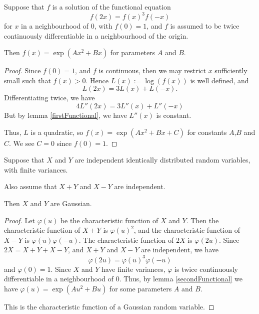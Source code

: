 \documentclass{unswmaths}
\begin{document}
\begin{lemma}
\label{secondFunctional}
    Suppose that $f$ is a solution of
    the functional equation
    \begin{equation*}
        f(2x) = f(x)^3f(-x)
    \end{equation*} 
    for $x$ in a neighbourhood of $0$, 
    with $f(0) = 1$, and $f$ is assumed to be twice
    continuously
    differentiable in a neighbourhood of
    the origin.
    
    Then $f(x) = \exp(Ax^2+Bx)$ for parameters $A$ and $B$.
\end{lemma} 
\begin{proof}
    Since $f(0) = 1$, and $f$ is continuous, then we may restrict
    $x$ sufficiently small such that $f(x) > 0$. Hence $L(x) := \log(f(x))$
    is well defined, and
    \begin{equation*}
        L(2x) = 3L(x)+L(-x).
    \end{equation*}
    Differentiating twice, we have
    \begin{equation*}
        4L''(2x) = 3L''(x)+L''(-x)
    \end{equation*}
    But by lemma \ref{firstFunctional}, we have $L''(x)$
    is constant. 
    
    Thus, $L$ is a quadratic, so $f(x) = \exp(Ax^2+Bx+C)$
    for constants $A$,$B$ and $C$. We see $C=0$
    since $f(0) = 1$.    
\end{proof}

\begin{theorem}
    Suppose that $X$ and $Y$ are independent identically distributed random
    variables, with finite variances.
    
    Also assume that $X+Y$ and $X-Y$ are independent.
    
    Then $X$ and $Y$ are Gaussian.
\end{theorem}
\begin{proof}
    Let $\varphi(u)$ be the characteristic function of $X$ and $Y$.
    Then the characteristic function of $X+Y$ is $\varphi(u)^2$,
    and the characteristic function of $X-Y$ is $\varphi(u)\varphi(-u)$.
    The characteristic function of $2X$ is $\varphi(2u)$. Since
    $2X = X+Y+X-Y$, and $X+Y$ and $X-Y$ are independent, we have
    \begin{equation*}
        \varphi(2u) = \varphi(u)^3\varphi(-u)
    \end{equation*}
    and $\varphi(0) = 1$. Since $X$ and $Y$
    have finite variances, $\varphi$ is twice continuously
    differentiable in a neighbourhood of $0$. Thus,
    by lemma \ref{secondFunctional} we have $\varphi(u) = \exp(Au^2+Bu)$
    for some parameters $A$ and $B$.
    
    This is the characteristic function of a Gaussian random variable.
\end{proof} 
\end{document}
